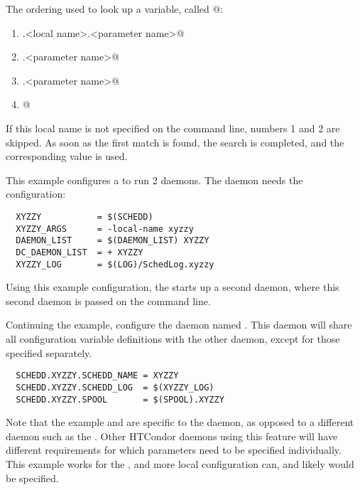 The ordering used to look up a variable, called @:

\begin{enumerate}
\item {}.<local name>.<parameter name>@

\item {}.<parameter name>@

\item {}.<parameter name>@

\item {}@
\end{enumerate}

If this local name is not specified on the command line, 
numbers 1 and 2 are skipped.
As soon as the first match is found, the search is completed,
and the corresponding value is used.

This example configures a  to run 2 
daemons.  The  daemon needs the configuration:
\begin{verbatim}
  XYZZY           = $(SCHEDD)
  XYZZY_ARGS      = -local-name xyzzy
  DAEMON_LIST     = $(DAEMON_LIST) XYZZY
  DC_DAEMON_LIST  = + XYZZY
  XYZZY_LOG       = $(LOG)/SchedLog.xyzzy
\end{verbatim}

Using this example configuration, the  starts up a
second  daemon, 
where this second  daemon is passed 
on the command line.

Continuing the example,
configure the  daemon named .
This  daemon will share all configuration variable
definitions with the other  daemon,
except for those specified separately.

\begin{verbatim}
  SCHEDD.XYZZY.SCHEDD_NAME = XYZZY
  SCHEDD.XYZZY.SCHEDD_LOG  = $(XYZZY_LOG)
  SCHEDD.XYZZY.SPOOL       = $(SPOOL).XYZZY
\end{verbatim}

Note that the example  and  are
specific to the  daemon, as opposed to a different daemon
such as the .
Other HTCondor daemons using this feature will
have different requirements for which parameters need to be
specified individually.  This example works for the ,
and more local configuration can, and likely would be specified.

